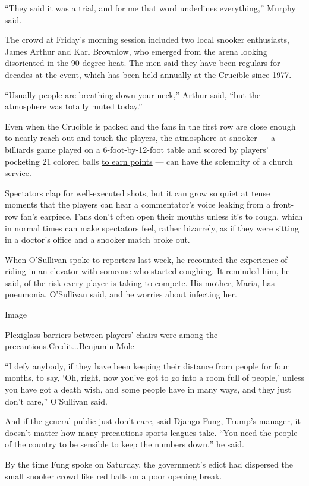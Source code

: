 ``They said it was a trial, and for me that word underlines
everything,'' Murphy said.

The crowd at Friday's morning session included two local snooker
enthusiasts, James Arthur and Karl Brownlow, who emerged from the arena
looking disoriented in the 90-degree heat. The men said they have been
regulars for decades at the event, which has been held annually at the
Crucible since 1977.

``Usually people are breathing down your neck,'' Arthur said, ``but the
atmosphere was totally muted today.''

Even when the Crucible is packed and the fans in the first row are close
enough to nearly reach out and touch the players, the atmosphere at
snooker --- a billiards game played on a 6-foot-by-12-foot table and
scored by players' pocketing 21 colored balls
\href{https://www.youtube.com/watch?v=CjSWUTkupQo}{to earn points} ---
can have the solemnity of a church service.

Spectators clap for well-executed shots, but it can grow so quiet at
tense moments that the players can hear a commentator's voice leaking
from a front-row fan's earpiece. Fans don't often open their mouths
unless it's to cough, which in normal times can make spectators feel,
rather bizarrely, as if they were sitting in a doctor's office and a
snooker match broke out.

When O'Sullivan spoke to reporters last week, he recounted the
experience of riding in an elevator with someone who started coughing.
It reminded him, he said, of the risk every player is taking to compete.
His mother, Maria, has pneumonia, O'Sullivan said, and he worries about
infecting her.

Image

Plexiglass barriers between players' chairs were among the
precautions.Credit...Benjamin Mole

``I defy anybody, if they have been keeping their distance from people
for four months, to say, `Oh, right, now you've got to go into a room
full of people,' unless you have got a death wish, and some people have
in many ways, and they just don't care,'' O'Sullivan said.

And if the general public just don't care, said Django Fung, Trump's
manager, it doesn't matter how many precautions sports leagues take.
``You need the people of the country to be sensible to keep the numbers
down,'' he said.

By the time Fung spoke on Saturday, the government's edict had dispersed
the small snooker crowd like red balls on a poor opening break.

